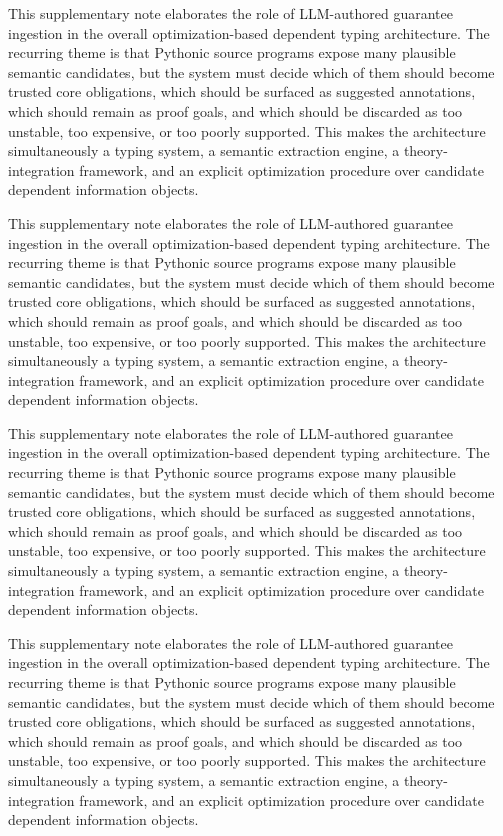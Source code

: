 \documentclass[11pt]{article}
\theoremstyle{definition}
\theoremstyle{plain}
\begin{document}
This supplementary note elaborates the role of LLM-authored guarantee ingestion in the overall
optimization-based dependent typing architecture. The recurring theme is that
Pythonic source programs expose many plausible semantic candidates, but the
system must decide which of them should become trusted core obligations, which
should be surfaced as suggested annotations, which should remain as proof
goals, and which should be discarded as too unstable, too expensive, or too
poorly supported. This makes the architecture simultaneously a typing system,
a semantic extraction engine, a theory-integration framework, and an explicit
optimization procedure over candidate dependent information objects.

This supplementary note elaborates the role of LLM-authored guarantee ingestion in the overall
optimization-based dependent typing architecture. The recurring theme is that
Pythonic source programs expose many plausible semantic candidates, but the
system must decide which of them should become trusted core obligations, which
should be surfaced as suggested annotations, which should remain as proof
goals, and which should be discarded as too unstable, too expensive, or too
poorly supported. This makes the architecture simultaneously a typing system,
a semantic extraction engine, a theory-integration framework, and an explicit
optimization procedure over candidate dependent information objects.

This supplementary note elaborates the role of LLM-authored guarantee ingestion in the overall
optimization-based dependent typing architecture. The recurring theme is that
Pythonic source programs expose many plausible semantic candidates, but the
system must decide which of them should become trusted core obligations, which
should be surfaced as suggested annotations, which should remain as proof
goals, and which should be discarded as too unstable, too expensive, or too
poorly supported. This makes the architecture simultaneously a typing system,
a semantic extraction engine, a theory-integration framework, and an explicit
optimization procedure over candidate dependent information objects.

This supplementary note elaborates the role of LLM-authored guarantee ingestion in the overall
optimization-based dependent typing architecture. The recurring theme is that
Pythonic source programs expose many plausible semantic candidates, but the
system must decide which of them should become trusted core obligations, which
should be surfaced as suggested annotations, which should remain as proof
goals, and which should be discarded as too unstable, too expensive, or too
poorly supported. This makes the architecture simultaneously a typing system,
a semantic extraction engine, a theory-integration framework, and an explicit
optimization procedure over candidate dependent information objects.
\end{document}
